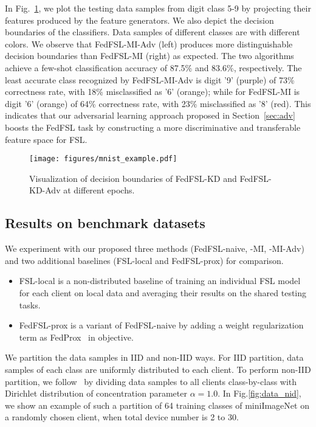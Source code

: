 In Fig.~\ref{fig:mnist_example}, 
we plot the testing data samples from digit class 5-9 by projecting their features produced by the feature generators. We also depict the decision boundaries of the classifiers. Data samples of different classes are with different colors. 
We observe that FedFSL-MI-Adv (left) produces more distinguishable decision boundaries than FedFSL-MI (right) as expected. The two algorithms achieve a few-shot classification accuracy of 87.5\% and 83.6\%, respectively.
The least accurate class recognized by FedFSL-MI-Adv is digit '9' (purple) of 73\% correctness rate, with 18\% misclassified as '6' (orange); while for FedFSL-MI is digit '6' (orange) of 64\% correctness rate, with 23\% misclassified as '8' (red). 
This indicates that our adversarial learning approach proposed in Section~\ref{sec:adv} boosts the FedFSL task by constructing a more discriminative and transferable feature space for FSL.


\begin{figure}[t]
\begin{center}
\texttt{[image: figures/mnist\_example.pdf]}
\end{center}
\vspace{-10pt}
 \caption{Visualization of decision boundaries of FedFSL-KD and FedFSL-KD-Adv at different epochs.}
\label{fig:mnist_example}
\vspace{-10pt}
\end{figure}




\subsection{Results on benchmark datasets}
We experiment with our proposed three methods (FedFSL-naive, -MI, -MI-Adv) and two additional baselines (FSL-local and FedFSL-prox) for comparison.
\begin{itemize} [leftmargin=*]
\item FSL-local is a non-distributed baseline of training an individual FSL model for each client on local data and averaging their results on the shared testing tasks. 
\item FedFSL-prox is a variant of FedFSL-naive by adding a weight regularization term as FedProx~\cite{li2018federated} in objective.
\end{itemize}
We partition the data samples in IID and non-IID ways. For IID partition, data samples of each class are uniformly distributed to each client. To perform non-IID partition, we follow~\cite{hsu2019measuring,yu2020salvaging} by dividing data samples to all clients class-by-class with Dirichlet distribution of concentration parameter $\alpha = 1.0$. In Fig.\ref{fig:data_nid}, we show an example of such a partition of 64 training classes of miniImageNet on a randomly chosen client, when total device number is 2 to 30.


